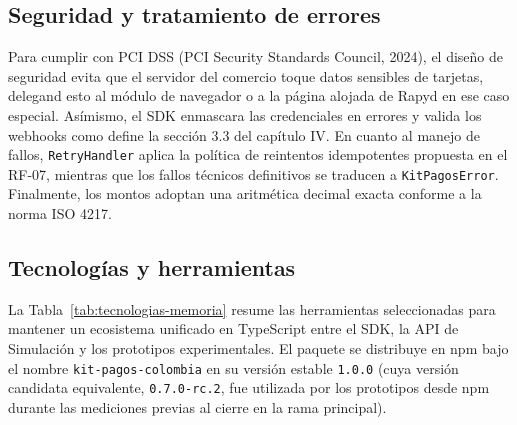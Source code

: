 \subsection{Seguridad y tratamiento de errores}

Para cumplir con PCI DSS (PCI Security Standards Council, 2024), el diseño de seguridad evita que el servidor del comercio toque datos sensibles de tarjetas, delegand esto al módulo de navegador o a la página alojada de Rapyd en ese caso especial. Asímismo, el SDK enmascara las credenciales en errores y valida los webhooks como define la sección 3.3 del capítulo IV. En cuanto al manejo de fallos, \texttt{RetryHandler} aplica la política de reintentos idempotentes propuesta en el RF-07, mientras que los fallos técnicos definitivos se traducen a \texttt{KitPagosError}. Finalmente, los montos adoptan una aritmética decimal exacta conforme a la norma ISO 4217.

\subsection{Tecnologías y herramientas}

La Tabla~\ref{tab:tecnologias-memoria} resume las herramientas seleccionadas para mantener un ecosistema unificado en TypeScript entre el SDK, la API de Simulación y los prototipos experimentales. El paquete se distribuye en npm bajo el nombre \texttt{kit-pagos-colombia} en su versión estable \texttt{1.0.0} (cuya versión candidata equivalente, \texttt{0.7.0-rc.2}, fue utilizada por los prototipos desde npm durante las mediciones previas al cierre en la rama principal).

